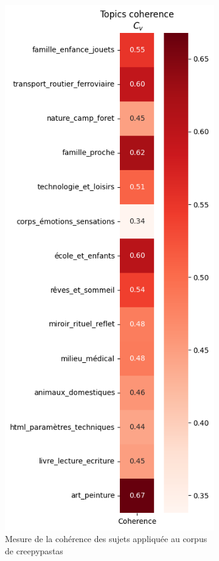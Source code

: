 \documentclass[12pt,a4paper,oneside,titlepage]{book} %
\begin{document}
\begin{figure}[htbp]
\centering
\begin{subfigure}[b]{0.45\textwidth}
    \includegraphics[width=0.5\linewidth]{illustration/coherence_corpus.png}
    \caption{Mesure de la cohérence des sujets appliquée au corpus de creepypastas}
    \label{fig:coherence_corpus}
\end{subfigure}
\centering
\begin{subfigure}[b]{0.45\textwidth}

\end{subfigure}
\end{figure}
\end{document}
